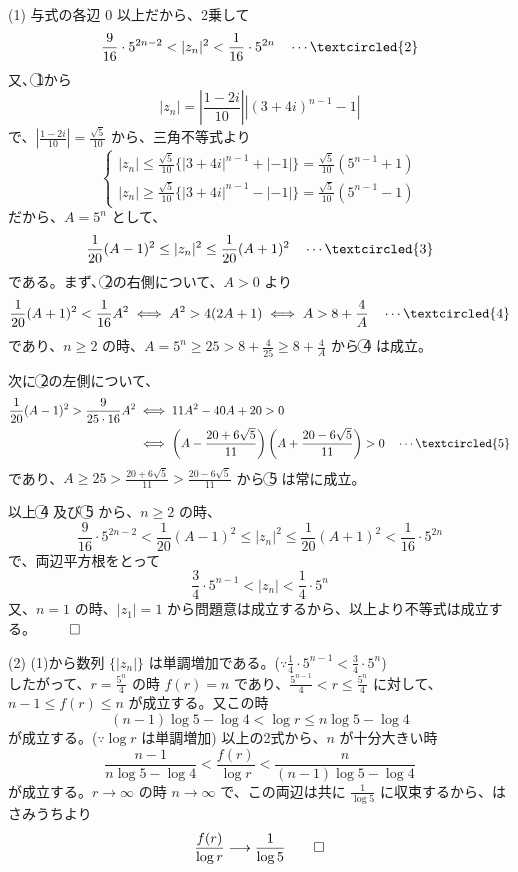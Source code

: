 \documentclass[../main.tex]{subfiles}
\begin{document}
\bigskip

\noindent
(1) 与式の各辺 $0$ 以上だから、2乗して
\[
  \frac{9}{16} \cdot 5^{2n-2} < |z_n|^2 < \frac{1}{16} \cdot 5^{2n} \quad \cdots \textcircled{2}
\]
又、\textcircled{1}から
\[
  |z_n| = \left|\frac{1-2i}{10}\right| |(3+4i)^{n-1} - 1|
\]
で、$\left|\frac{1-2i}{10}\right| = \frac{\sqrt{5}}{10}$ から、三角不等式より
\[
  \begin{cases}
    |z_n| \le \frac{\sqrt{5}}{10} \{ |3+4i|^{n-1} + |-1| \} = \frac{\sqrt{5}}{10} (5^{n-1} + 1) \\
    |z_n| \ge \frac{\sqrt{5}}{10} \{ |3+4i|^{n-1} - |-1| \} = \frac{\sqrt{5}}{10} (5^{n-1} - 1)
  \end{cases}
\]
だから、$A = 5^n$ として、
\[
  \frac{1}{20}(A-1)^2 \le |z_n|^2 \le \frac{1}{20}(A+1)^2 \quad \cdots \textcircled{3}
\]
である。まず、\textcircled{2}の右側について、$A>0$ より
\[
  \frac{1}{20}(A+1)^2 < \frac{1}{16} A^2 \iff A^2 > 4(2A+1) \iff A > 8 + \frac{4}{A} \quad \cdots \textcircled{4}
\]
であり、$n \ge 2$ の時、$A = 5^n \ge 25 > 8 + \frac{4}{25} \ge 8 + \frac{4}{A}$ から \textcircled{4} は成立。

\bigskip

\noindent
次に \textcircled{2}の左側について、
\begin{align*}
  \frac{1}{20}(A-1)^2 > \frac{9}{25 \cdot 16} A^2 &\iff 11A^2 - 40A + 20 > 0 \\
  &\iff \left( A - \frac{20 + 6\sqrt{5}}{11} \right) \left( A + \frac{20 - 6\sqrt{5}}{11} \right) > 0 \quad \cdots \textcircled{5}
\end{align*}
であり、$A \ge 25 > \frac{20 + 6\sqrt{5}}{11} > \frac{20 - 6\sqrt{5}}{11}$ から \textcircled{5} は常に成立。

\bigskip

\noindent
以上 \textcircled{4} 及び \textcircled{5} から、$n \ge 2$ の時、
\[
  \frac{9}{16} \cdot 5^{2n-2} < \frac{1}{20}(A-1)^2 \le |z_n|^2 \le \frac{1}{20}(A+1)^2 < \frac{1}{16} \cdot 5^{2n}
\]
で、両辺平方根をとって
\[
  \frac{3}{4} \cdot 5^{n-1} < |z_n| < \frac{1}{4} \cdot 5^n
\]
又、$n=1$ の時、$|z_1|=1$ から問題意は成立するから、以上より不等式は成立する。 \hfill $\qed$

\bigskip

\noindent
(2) (1)から数列 $\{|z_n|\}$ は単調増加である。($\because \frac{1}{4} \cdot 5^{n-1} < \frac{3}{4} \cdot 5^n$) \\
したがって、$r = \frac{5^n}{4}$ の時 $f(r) = n$ であり、$\frac{5^{n-1}}{4} < r \le \frac{5^n}{4}$ に対して、$n-1 \le f(r) \le n$ が成立する。又この時
\[
  (n-1)\log 5 - \log 4 < \log r \le n\log 5 - \log 4
\]
が成立する。($\because \log r$ は単調増加) 以上の2式から、$n$ が十分大きい時
\[
  \frac{n-1}{n\log 5 - \log 4} < \frac{f(r)}{\log r} < \frac{n}{(n-1)\log 5 - \log 4}
\]
が成立する。$r \to \infty$ の時 $n \to \infty$ で、この両辺は共に $\frac{1}{\log 5}$ に収束するから、はさみうちより
\[
  \frac{f(r)}{\log r} \longrightarrow \frac{1}{\log 5} \hfill \qed
\]
\end{document}

